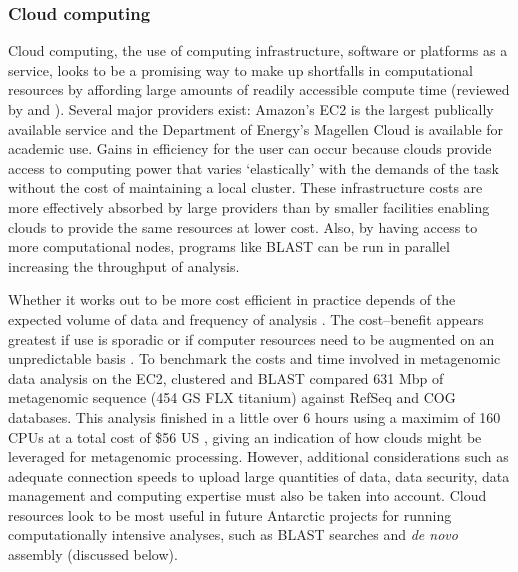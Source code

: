 \subsubsection{Cloud computing}
Cloud computing, the use of computing infrastructure, software or platforms as a service, looks to be a promising way to make up shortfalls in computational resources by affording large amounts of readily accessible compute time (reviewed by \citet{Schatz2010} and \citet{Thakur2012}).
Several major providers exist: Amazon's \ac{EC2} is the largest publically available service and the Department of Energy's Magellen Cloud is available for academic use.
Gains in efficiency for the user can occur because clouds provide access to computing power that varies `elastically' with the demands of the task without the cost of maintaining a local cluster.
These infrastructure costs are more effectively absorbed by large providers than by smaller facilities enabling clouds to provide the same resources at lower cost.
Also, by having access to more computational nodes, programs like \acs{BLAST} can be run in parallel increasing the throughput of analysis.

Whether it works out to be more cost efficient in practice depends of the expected volume of data and frequency of analysis \cite{Wilkening2009}.
The cost--benefit appears greatest if use is sporadic or if computer resources need to be augmented on an unpredictable basis \cite{Wilkening2009}.
To benchmark the costs and time involved in metagenomic data analysis on the \ac{EC2}, \citet{Angiuoli2011} clustered and \acs{BLAST} compared 631 Mbp of metagenomic sequence (454 GS FLX titanium) against RefSeq and \acs{COG} databases.
This analysis finished in a little over 6 hours using a maximim of 160 \acs{CPU}s at a total cost of \$56 US \cite{Angiuoli2011}, giving an indication of how clouds might be leveraged for metagenomic processing.
However, additional considerations such as adequate connection speeds to upload large quantities of data, data security, data management and computing expertise must also be taken into account.
Cloud resources look to be most useful in future Antarctic projects for running computationally intensive analyses, such as \acs{BLAST} searches and \emph{de novo} assembly (discussed below).

